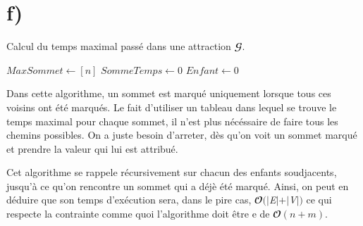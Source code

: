 \documentclass[11pt,a4paper, oneside, oldfontcommands]{memoir}
\newcommand{\G}{$\mathbfcal{G}$}
\newcommand{\V}{$\textit{V}$}
\newcommand{\E}{$\textit{E}$}
\begin{document}
\newpage
\section{f)}
  \IncMargin{1em}
  \begin{algorithm}[H]

    \caption{Calcul du temps maximal passé dans une attraction \G{}.}
    \DontPrintSemicolon
    \LinesNumbered
    \SetAlgoLined

    $MaxSommet \leftarrow [n]$\;
    $SommeTemps \leftarrow 0$\;
    $Enfant \leftarrow 0$\;

    \;
  \end{algorithm}
  \DecMargin{1em}

  \BlankLine
  
Dans cette algorithme, un sommet est marqué uniquement lorsque tous ces voisins ont été marqués.
Le fait d'utiliser un tableau dans lequel se trouve le temps maximal pour chaque sommet,
il n'est plus nécéssaire de faire tous les chemins possibles. On a juste besoin d'arreter,
dès qu'on voit un sommet marqué et prendre la valeur qui lui est attribué.

\BlankLine

Cet algorithme se rappele récursivement sur chacun des enfants soudjacents, jusqu'à ce qu'on 
rencontre un sommet qui a déjè été marqué.
Ainsi, on peut en déduire que son temps d’exécution sera, dans le pire cas, $\mathbfcal{O}(|\E{}| + |\V{}|)$ ce 
qui respecte la contrainte comme quoi l'algorithme doit être e de $\mathbfcal{O}(n + m)$.

\newpage
\end{document}
